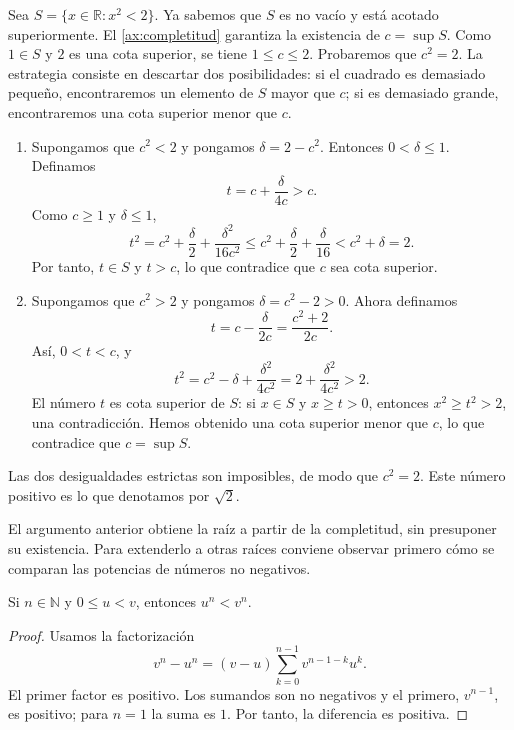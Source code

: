 \begin{example}
\label{ej:raiz-dos-completitud}
Sea $S=\{x\in\mathbb{R}:x^2<2\}$. Ya sabemos que $S$ es no vacío y está acotado superiormente. El \cref{ax:completitud} garantiza la existencia de $c=\sup S$. Como $1\in S$ y $2$ es una cota superior, se tiene $1\leq c\leq2$. Probaremos que $c^2=2$. La estrategia consiste en descartar dos posibilidades: si el cuadrado es demasiado pequeño, encontraremos un elemento de $S$ mayor que $c$; si es demasiado grande, encontraremos una cota superior menor que $c$.
\begin{enumerate}
    \item Supongamos que $c^2<2$ y pongamos $\delta=2-c^2$. Entonces $0<\delta\leq1$. Definamos
    \[
     t=c+\frac{\delta}{4c}>c.
    \]
    Como $c\geq1$ y $\delta\leq1$,
    \[
     t^2
     =c^2+\frac{\delta}{2}+\frac{\delta^2}{16c^2}
     \leq c^2+\frac{\delta}{2}+\frac{\delta}{16}
     <c^2+\delta=2.
    \]
    Por tanto, $t\in S$ y $t>c$, lo que contradice que $c$ sea cota superior.
    \item Supongamos que $c^2>2$ y pongamos $\delta=c^2-2>0$. Ahora definamos
    \[
     t=c-\frac{\delta}{2c}
      =\frac{c^2+2}{2c}.
    \]
    Así, $0<t<c$, y
    \[
     t^2=c^2-\delta+\frac{\delta^2}{4c^2}
         =2+\frac{\delta^2}{4c^2}>2.
    \]
    El número $t$ es cota superior de $S$: si $x\in S$ y $x\geq t>0$, entonces $x^2\geq t^2>2$, una contradicción. Hemos obtenido una cota superior menor que $c$, lo que contradice que $c=\sup S$.
\end{enumerate}
Las dos desigualdades estrictas son imposibles, de modo que $c^2=2$. Este número positivo es lo que denotamos por $\sqrt2$.
\end{example}

El argumento anterior obtiene la raíz a partir de la completitud, sin presuponer su existencia. Para extenderlo a otras raíces conviene observar primero cómo se comparan las potencias de números no negativos.

\begin{samepage}
\begin{lemma}
\label{lem:orden-potencias}
Si $n\in\mathbb{N}$ y $0\leq u<v$, entonces $u^n<v^n$.
\end{lemma}
\end{samepage}

\begin{proof}
Usamos la factorización
\[
 v^n-u^n=(v-u)\sum_{k=0}^{n-1}v^{n-1-k}u^k.
\]
El primer factor es positivo. Los sumandos son no negativos y el primero, $v^{n-1}$, es positivo; para $n=1$ la suma es $1$. Por tanto, la diferencia es positiva.
\end{proof}

